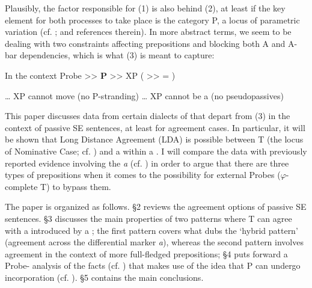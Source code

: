 \documentclass[output=paper]{langsci/langscibook}
\begin{document}
    \z

Plausibly, the factor responsible for (1) is also behind (2), at least if the key element for both processes to take place is the category P, a locus of parametric variation (cf. \citealt{Hornstein1981,Kayne1984,Kayne1994,Kayne2005,Abels2003}; and references therein). In more abstract terms, we seem to be dealing with two constraints affecting prepositions and blocking both A and A-bar dependencies, which is what (3) is meant to capture:

\ea%
    \label{ex:gallego:3}
     In the context Probe >>  \textbf{P}  >>  XP  ( >> = )\\
     \begin{xlisti}\setcounter{xnumii}{1}
     \ex \ldots\xspace XP cannot move (no P-stranding)
     \ex \ldots\xspace XP cannot be a  (no pseudopassives)
     \end{xlisti}
\z

This paper discusses data from certain dialects of  that depart from (3) in the context of passive SE sentences, at least for agreement cases. In particular, it will be shown that Long Distance Agreement (LDA) is possible between T (the locus of Nominative Case; cf. \citealt{Chomsky2000,Chomsky2001Derivation}) and a \CATDP {} within a \CATPP. I will compare the data with previously reported evidence involving the   \textit{a} (cf. \citealt{Torrego1998,López2012}) in order to argue that there are three types of prepositions when it comes to the possibility for external Probes ($\varphi $-complete T) to bypass them.

The paper is organized as follows. §2 reviews the agreement options of passive SE sentences. §3 discusses the main properties of two patterns where T can agree with a \CATDP introduced by a ; the first pattern covers what \citet{RAE-ASALE2009} dubs the ‘hybrid pattern’ (agreement across the differential marker \textit{a}), whereas the second pattern involves agreement in the context of more full-fledged prepositions; §4 puts forward a Probe- analysis of the facts (cf. \citealt{Chomsky2000,Chomsky2001Derivation}) that makes use of the idea that P can undergo incorporation (cf. \citealt{Hornstein1981,Law2006}). §5 contains the main conclusions.
\end{document}
